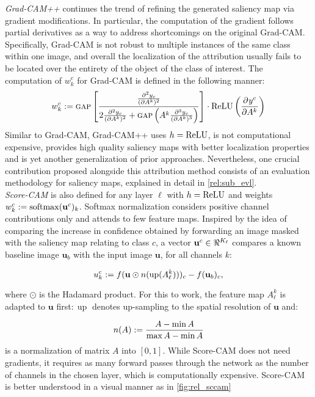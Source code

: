 \noindent \emph{Grad-CAM++} \autocite{chattopadhay2018grad} continues the trend of refining the 
generated saliency map via gradient modifications. In particular, the computation of the gradient 
follows partial derivatives as a way to address shortcomings on the original Grad-CAM. Specifically, 
Grad-CAM is not robust to multiple instances of the same class within one image, and overall the 
localization of the attribution usually fails to be located over the entirety of the object of 
the class of interest. The computation of $w^c_k$ for Grad-CAM is defined in the following manner:
\begin{equation}
	w^c_k \mathrel{:=} {\textsc{gap}} \left[\frac{\frac{\partial^2 y_c}{(\partial A^k)^2}}{2\frac{\partial^2 y_c}
	{(\partial A^k)^2}+{\textsc{gap}}\left(A^k \frac{\partial^3 y_c}{(\partial A^k)^3}\right)}\right] \cdot 
	{\operatorname{ReLU}} \left(\frac{\partial^{}{y^c}}{\partial{{A^k}^{}}}\right)
	\label{eq:gcampp_coeff}
\end{equation}
Similar to Grad-CAM, Grad-CAM++ uses $h = {\operatorname{ReLU}}$, is not computational expensive, 
provides high quality saliency maps with better localization properties and is yet another 
generalization of prior approaches. Nevertheless, one crucial contribution proposed alongside this 
attribution method consists of an evaluation methodology for saliency maps, explained in detail in 
\autoref{rel:sub_evl}.\\

\noindent\emph{Score-CAM} \autocite{wang2020score} is also defined for any layer $\ell$ with 
$h = {\operatorname{ReLU}}$ and weights $w^c_k \mathrel{:=} \operatorname{softmax}(\mathbf{u}^c)_k$.  Softmax normalization considers 
positive channel contributions only and attends to few feature maps. Inspired by the idea of 
comparing the increase in confidence obtained by forwarding an image masked with the saliency map 
relating to class $c$, a vector $\mathbf{u}^c \in \real^{K_\ell}$ compares a known baseline image 
$\mathbf{u}_b$ with the input image $\mathbf{u}$, for all channels $k$:

\begin{equation}
	u^c_k \mathrel{:=} f(\mathbf{u} \odot n(\operatorname{up}( A^k_\ell )))_c - f(\mathbf{u}_b)_c,
\label{eq:s-cam}
\end{equation}

where $\odot$ is the Hadamard product. For this to work, the feature map $A^k_\ell$ is adapted 
to $\mathbf{u}$ first$:\operatorname{up}$ denotes up-sampling to the spatial resolution of 
$\mathbf{u}$ and:

\begin{equation}
	n(A) \mathrel{:=} \frac{A - \min A}{\max A - \min A}
\label{eq:norm}
\end{equation}
is a normalization of matrix $A$ into $[0,1]$. While Score-CAM does not need gradients, it requires 
as many forward passes through the network as the number of channels in the chosen layer, which is 
computationally expensive. Score-CAM is better understood in a visual manner as in 
\autoref{fig:rel_sccam}\\


